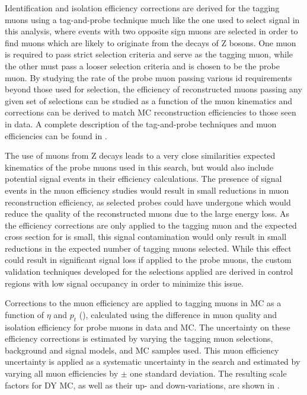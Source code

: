 Identification and isolation efficiency corrections are derived for the tagging muons using a tag-and-probe technique much like the one used to select signal in this analysis, where events with two opposite sign muons are selected in order to find muons which are likely to originate from the decays of Z bosons.
One muon is required to pass strict selection criteria and serve as the tagging muon, while the other must pass a looser selection criteria and is chosen to be the probe muon.
By studying the rate of the probe muon passing various id requirements beyond those used for selection, the efficiency of reconstructed muons passing any given set of selections can be studied as a function of the muon kinematics and corrections can be derived to match MC reconstruction efficiencies to those seen in data. 
A complete description of the tag-and-probe techniques and muon efficiencies can be found in \cite{cmsMuonPerformance}.

The use of muons from Z decays leads to a very close similarities expected kinematics of the probe muons used in this search, but would also include potential signal events in their efficiency calculations. 
The presence of signal events in the muon efficiency studies would result in small reductions in muon reconstruction efficiency, as selected probes could have undergone \dbrem which would reduce the quality of the reconstructed muons due to the large energy loss. 
As the efficiency corrections are only applied to the tagging muon and the expected cross section for \dbrem is small, this signal contamination would only result in small reductions in the expected number of tagging muons selected.
While this effect could result in significant signal loss if applied to the probe muons, the custom validation techniques developed for the selections applied are derived in control regions with low signal occupancy in order to minimize this issue.

Corrections to the muon efficiency are applied to tagging muons in MC as a function of $\eta$ and $p_t$ (), calculated using the difference in muon quality and isolation efficiency for probe muons in data and MC. 
The uncertainty on these efficiency corrections is estimated by varying the tagging muon selections, background and signal models, and MC samples used. 
This muon efficiency uncertainty is applied as a systematic uncertainty in the search and estimated by varying all muon efficiencies by $\pm$ one standard deviation.
The resulting scale factors for DY MC, as well as their up- and down-variations, are shown in .


